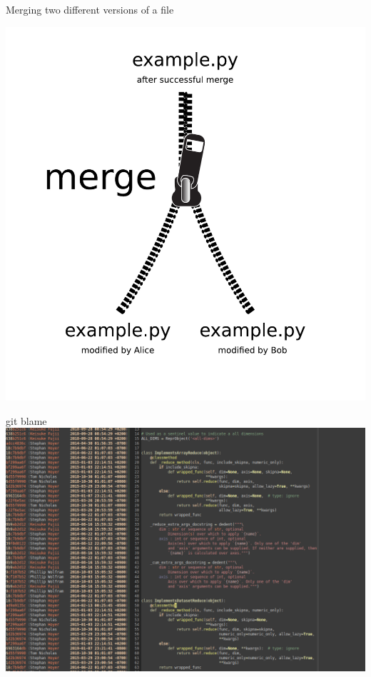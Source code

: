 \begin{frame}{Merging two different versions of a file}
    \begin{center}
        \includegraphics[height=\textheight]{images/merge.pdf}
    \end{center}
\end{frame}


\begin{frame}[fragile]{git blame}
    \includegraphics[width=\textwidth]{images/git-blame-screenshot.png}
\end{frame}


